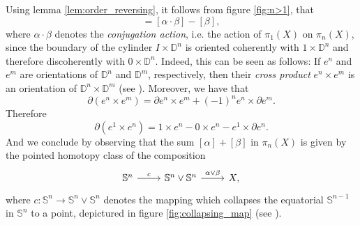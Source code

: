 Using lemma \ref{lem:order_reversing}, it follows from figure \ref{fig:n>1}, that
\begin{equation*}
	[\alpha,\beta] = [\alpha \cdot \beta] - [\beta],
\end{equation*}
\noindent where $\alpha \cdot \beta$ denotes the \emph{conjugation action}, i.e. the action of $\pi_1(X)$ on $\pi_n(X)$, since the boundary of the cylinder $I \times \mathbb{D}^n$ is oriented coherently with $1 \times \mathbb{D}^n$ and therefore discoherently with $0 \times \mathbb{D}^n$. Indeed, this can be seen as follows: If $e^n$ and $e^m$ are orientations of $\mathbb{D}^n$ and $\mathbb{D}^m$, respectively, then their \emph{cross product} $e^n \times e^m$ is an orientation of $\mathbb{D}^n \times \mathbb{D}^m$ (see \cite[64]{whitehead:homotopy_theory:1978}). Moreover, we have that 
\begin{equation*}
	\partial(e^n \times e^m) = \partial e^n \times e^m + (-1)^n e^n \times \partial e^m.
\end{equation*}
Therefore
\begin{equation*}
	\partial(e^1 \times e^n) = 1 \times e^n - 0 \times e^n - e^1 \times \partial e^n.
\end{equation*}
And we conclude by observing that the sum $[\alpha] + [\beta]$ in $\pi_n(X)$ is given by the pointed homotopy class of the composition
\begin{equation*}
	\begin{tikzcd}
		\mathbb{S}^n \arrow[r,"c"] & \mathbb{S}^n \vee \mathbb{S}^n \arrow[r,"\alpha \vee \beta"] & X,
	\end{tikzcd}
\end{equation*}
\noindent where $c : \mathbb{S}^n \to \mathbb{S}^n \vee \mathbb{S}^n$ denotes the mapping which collapses the equatorial $\mathbb{S}^{n - 1}$ in $\mathbb{S}^n$ to a point, depictured in figure \ref{fig:collapsing_map} (see \cite[341]{hatcher:algebraic_topology:2001}).

